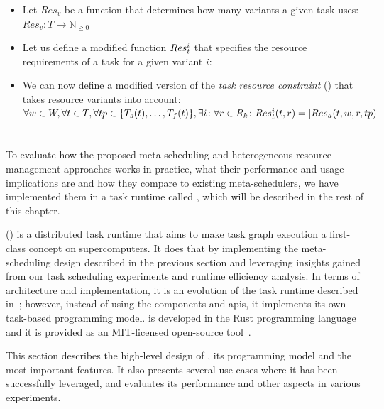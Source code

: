 \begin{itemize}[itemsep=0pt]
	\item Let $Res_v$ be a function that determines how many variants a given task uses: \\
	      $Res_v\colon T \rightarrow \mathbb{N}_{\geq{}0}$
	\item Let us define a modified function $Res_t^{i}$ that specifies the resource requirements
	      of a task for a given variant $i$: \\ 
	\item We can now define a modified version of the \emph{task resource constraint}
	      () that takes resource variants
	      into account: \\ $\forall w\in{}W, \forall t\in{}T, \forall
		      tp\in\{T_s(t),\ldots,T_f(t)\}, \exists i\colon \forall
		      r\in{}R_k\colon Res_t^{i}(t, r) = |Res_a(t, w, r, tp)|$
\end{itemize}


\section{\hyperqueue{}}
To evaluate how the proposed meta-scheduling and heterogeneous resource management approaches works
in practice, what their performance and usage implications are and how they compare to existing
meta-schedulers, we have implemented them in a task runtime called \hyperqueue{}, which
will be described in the rest of this chapter.

\hyperqueue{} (\hq{}) is a distributed task runtime that aims to make task graph execution a
first-class concept on supercomputers. It does that by implementing the meta-scheduling design
described in the previous section and leveraging insights gained from our task scheduling
experiments and \dask{} runtime efficiency analysis. In terms of architecture and
implementation, it is an evolution of the \rsds{} task runtime described
in~; however, instead of using the \dask{} components and
\glspl{api}, it implements its own task-based programming model.
\hyperqueue{} is developed in the Rust programming language~\cite{rust} and
it is provided as an \mbox{MIT-licensed} open-source tool~\cite{hq_github}.

This section describes the high-level design of \hyperqueue{}, its programming model and
the most important features. It also presents several use-cases where it has been successfully
leveraged, and evaluates its performance and other aspects in various experiments.

